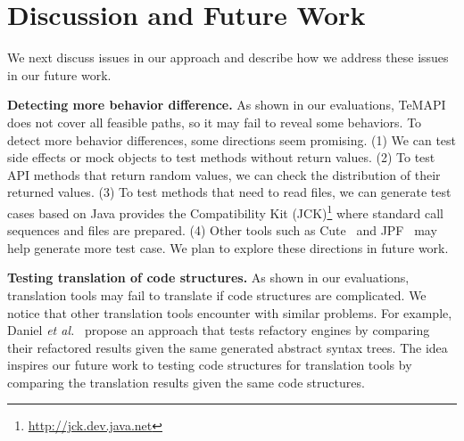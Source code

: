 

\section{Discussion and Future Work}
\label{sec:discuss}

We next discuss issues in our approach and describe how we address
these issues in our future work.

\textbf{Detecting more behavior difference.} As shown in our evaluations, TeMAPI does not cover all feasible paths, so it may fail to reveal some behaviors. To detect more behavior differences, some directions seem promising. (1) We can test side effects or  mock objects to test methods without return values. (2) To test API methods that return random values, we can check the distribution of their returned values. (3) To test methods that need to read files, we can generate test cases based on Java provides the Compatibility Kit (JCK)\footnote{\url{http://jck.dev.java.net}} where standard call sequences and files are prepared. (4) Other tools such as Cute~\cite{koushik:cute} and JPF~\cite{visser2003mcp} may help generate more test case. We plan to explore these directions in future work.

\textbf{Testing translation of code structures.} As shown in our evaluations, translation tools may fail to translate if code structures are complicated. We notice that other translation tools encounter with similar problems. For example, Daniel \emph{et al.}~\cite{daniel2007automated} propose an approach that tests refactory engines by comparing their refactored results given the same generated abstract syntax trees. The idea inspires our future work to testing code structures for translation tools by comparing the translation results given the same code structures.

